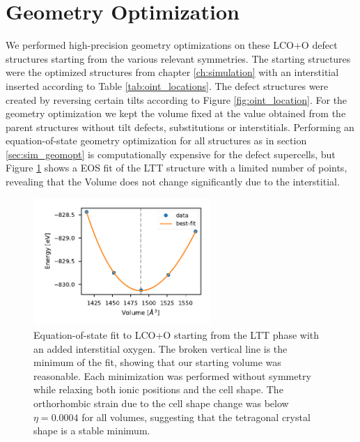\section{Geometry Optimization}
We performed high-precision geometry optimizations on these LCO+O defect structures starting from the various relevant symmetries. The starting structures were the optimized structures from chapter \ref{ch:simulation} with an interstitial inserted according to Table \ref{tab:oint_locations}. The defect structures were created by reversing certain tilts according to Figure \ref{fig:oint_location}. For the geometry optimization we kept the volume fixed at the value obtained from the parent structures without tilt defects, substitutions or interstitials. Performing an equation-of-state geometry optimization for all structures as in section \ref{sec:sim_geomopt} is computationally expensive for the defect supercells, but Figure \ref{fig:lcoo_eos} shows a EOS fit of the LTT structure with a limited number of points, revealing that the Volume does not change significantly due to the interstitial.

\begin{figure}
	\centering
	\includegraphics[width=0.6\textwidth]{fig/md/lcoo_eos.pdf}
	\caption[LCOO EOS]{Equation-of-state fit to LCO+O starting from the LTT phase with an added interstitial oxygen. The broken vertical line is the minimum of the fit, showing that our starting volume was reasonable. Each minimization was performed without symmetry while relaxing both ionic positions and the cell shape. The orthorhombic strain due to the cell shape change was below $\eta = 0.0004$ for all volumes, suggesting that the tetragonal crystal shape is a stable minimum.}
	\label{fig:lcoo_eos}
\end{figure}

